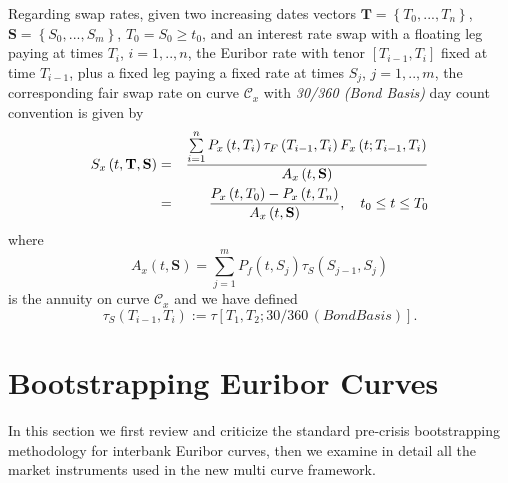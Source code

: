 \documentclass[11pt,reqno]{amsart}
\begin{document}
\par
Regarding swap rates, given two increasing dates vectors
$\mathbf{T=}\left\{T_{0},...,T_{n}\right\}$,
$\mathbf{S=}\left\{S_{0},...,S_{m}\right\}$, $T_{0}=S_{0}\geq t_0$, and an interest rate swap with a floating leg paying at times $T_{i}$, $i=1,..,n$, the Euribor rate with tenor
$\left[T_{i-1},T_{i}\right]$ fixed at time $T_{i-1}$, plus a fixed leg paying a fixed rate at times $S_{j}$, $j=1,..,m$, the corresponding fair swap rate on curve $\mathcal{C}_{x}$ with \emph{30/360 (Bond Basis)} day count convention is given by
\begin{eqnarray}
S_{x}\left(t,\mathbf{T},\mathbf{S}\right)
&=& \frac{\sum\limits_{i=1}^{n}P_{x}\left(t,T_{i}\right) \tau_F\left(T_{i-1},T_{i}\right) F_{x}\left(t;T_{i-1},T_{i}\right)}{A_{x}\left(t,\mathbf{S}\right)} \notag \\
&=& \frac{P_{x}\left(t,T_0\right) - P_{x}\left(t,T_n\right)}{A_{x}\left(t,\mathbf{S}\right)}
,\quad t_0\leq t\leq T_{0}
\label{eqn:SwapRateFwd}
\end{eqnarray}
where
\begin{equation}
A_{x}\left(t,\mathbf{S}\right)
= \sum\limits_{j=1}^{m}P_{f}\left(t,S_{j}\right) \tau_S\left(S_{j-1},S_{j}\right)
\end{equation}
is the annuity on curve $\mathcal{C}_{x}$ and we have defined
\begin{equation}
\tau_S\left(T_{i-1},T_{i}\right)
:= \tau\left[T_{1},T_{2};30/360\,(Bond Basis)\right].
\end{equation}

\section{\label{SecBootstrapping}Bootstrapping Euribor Curves}
In this section we first review and criticize the standard pre-crisis bootstrapping methodology for interbank Euribor curves, then we examine in detail all the market instruments used in the new multi curve framework.
\end{document}
